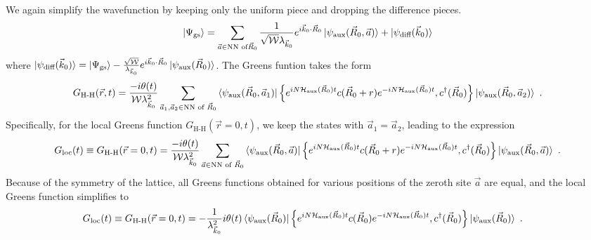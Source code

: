 \documentclass{report}
\numberwithin{equation}{section}
\begin{document}
We again simplify the wavefunction by keeping only the uniform piece and dropping the difference pieces.
\begin{equation}\begin{aligned}
	\ket{\Psi_\text{gs}} = \sum_{\vec a \in \text{NN of}\vec R_0}\frac{1}{\sqrt \mathcal{W}\lambda_{\vec k_0}} e^{i\vec{k}_0\cdot\vec{R}_0} \ket{\psi_\text{aux}(\vec R_0, \vec a)} + \ket{\psi_\text{diff}(\vec k_0)}
\end{aligned}\end{equation}
where \(\ket{\psi_\text{diff}(\vec k_0)} = \ket{\Psi_\text{gs}} - \frac{\sqrt \mathcal{W}}{\lambda_{\vec k_0}} e^{i\vec{k}_0\cdot\vec{R}_0} \ket{\psi_\text{aux}(\vec R_0)}\). The Greens funtion takes the form
\begin{equation}\begin{aligned}
G_\text{H-H}(\vec r, t) =  \frac{-i\theta(t)}{\mathcal{W} \lambda_{\vec k_0}^2}\sum_{\vec a_1, \vec a_2 \in \text{NN of }\vec R_0}\braket{\psi_\text{aux}(\vec R_0, \vec a_1) | \left\{ e^{i N \mathcal{H}_\text{aux}(\vec R_0) t}c(\vec R_0 + r)e^{-i N \mathcal{H}_\text{aux}(\vec R_0) t}, c^\dagger(\vec R_0) \right\} | \psi_\text{aux}(\vec R_0, \vec a_2)}~.
\end{aligned}\end{equation}
Specifically, for the local Greens function \(G_\text{H-H}(\vec r=0, t)\), we keep the states with \(\vec a_1 = \vec a_2\), leading to the expression
\begin{equation}\begin{aligned}\label{greens_func_approx}
	G_\text{loc}(t) \equiv G_\text{H-H}(\vec r=0, t) =  \frac{-i\theta(t)}{\mathcal{W} \lambda_{\vec k_0}^2}\sum_{\vec a \in \text{NN of }\vec R_0}\braket{\psi_\text{aux}(\vec R_0, \vec a) | \left\{ e^{i N \mathcal{H}_\text{aux}(\vec R_0) t}c(\vec R_0 + r)e^{-i N \mathcal{H}_\text{aux}(\vec R_0) t}, c^\dagger(\vec R_0) \right\} | \psi_\text{aux}(\vec R_0, \vec a)}~.
\end{aligned}\end{equation}
Because of the symmetry of the lattice, all Greens functions obtained for various positions of the zeroth site \(\vec a\) are equal, and the local Greens function simplifies to
\begin{equation}\begin{aligned}
	G_\text{loc}(t) \equiv G_\text{H-H}(\vec r=0, t) &= -\frac{1}{\lambda_{\vec k_0}^2 }i\theta(t) \braket{\psi_\text{aux}(\vec R_0) | \left\{ e^{i N \mathcal{H}_\text{aux}(\vec R_0) t}c(\vec R_0)e^{-i N \mathcal{H}_\text{aux}(\vec R_0) t}, c^\dagger(\vec R_0) \right\} | \psi_\text{aux}(\vec R_0)}~.
\end{aligned}\end{equation}
\end{document}
